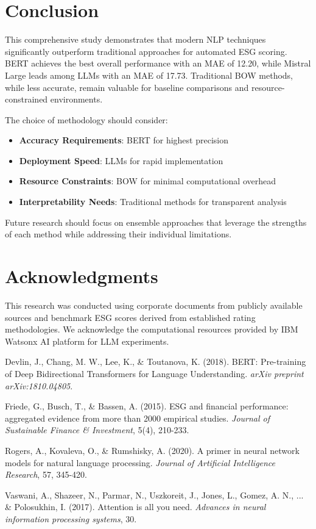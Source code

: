 \documentclass[12pt,a4paper]{article}
\begin{document}
\section{Conclusion}

This comprehensive study demonstrates that modern NLP techniques significantly outperform traditional approaches for automated ESG scoring. BERT achieves the best overall performance with an MAE of 12.20, while Mistral Large leads among LLMs with an MAE of 17.73. Traditional BOW methods, while less accurate, remain valuable for baseline comparisons and resource-constrained environments.

The choice of methodology should consider:
\begin{itemize}
    \item \textbf{Accuracy Requirements}: BERT for highest precision
    \item \textbf{Deployment Speed}: LLMs for rapid implementation
    \item \textbf{Resource Constraints}: BOW for minimal computational overhead
    \item \textbf{Interpretability Needs}: Traditional methods for transparent analysis
\end{itemize}

Future research should focus on ensemble approaches that leverage the strengths of each method while addressing their individual limitations.

\section{Acknowledgments}

This research was conducted using corporate documents from publicly available sources and benchmark ESG scores derived from established rating methodologies. We acknowledge the computational resources provided by IBM Watsonx AI platform for LLM experiments.


\begin{thebibliography}{9}

Devlin, J., Chang, M. W., Lee, K., \& Toutanova, K. (2018). 
BERT: Pre-training of Deep Bidirectional Transformers for Language Understanding. 
\textit{arXiv preprint arXiv:1810.04805}.

Friede, G., Busch, T., \& Bassen, A. (2015). 
ESG and financial performance: aggregated evidence from more than 2000 empirical studies. 
\textit{Journal of Sustainable Finance \& Investment}, 5(4), 210-233.

Rogers, A., Kovaleva, O., \& Rumshisky, A. (2020). 
A primer in neural network models for natural language processing. 
\textit{Journal of Artificial Intelligence Research}, 57, 345-420.

Vaswani, A., Shazeer, N., Parmar, N., Uszkoreit, J., Jones, L., Gomez, A. N., ... \& Polosukhin, I. (2017). 
Attention is all you need. 
\textit{Advances in neural information processing systems}, 30.

\end{thebibliography}
\end{document}
